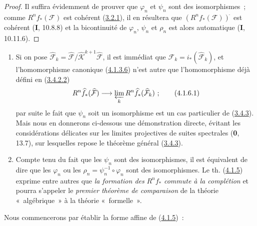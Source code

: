 \begin{proof}
Il suffira évidemment de prouver que $\varphi_n$ et $\psi_n$ sont des
isomorphismes~; comme $R^nf_*(\mathcal F)$ est cohérent
(\hyperref[III.3.2.1-fr]{3.2.1}), il en résultera que
$(R^nf_*(\mathcal F))^{\widehat{\,}}$ est cohérent (\textbf{I}, 10.8.8) et la bicontinuité
de $\varphi_n$, $\psi_n$ et $\rho_n$ est alors automatique (\textbf{I}, 10.11.6).
\end{proof}

\begin{remarks}[4.1.6]
\label{III.4.1.6-fr}
\upshape
\begin{enumerate}
\item[(i)] Si on pose
$\widehat{\mathcal F}_k=
\widehat{\mathcal F}/\widehat{\mathcal K}^{k+1}
\widehat{\mathcal F}$, il est immédiat que
$\mathcal F_k=i_*(\widehat{\mathcal F}_k)$, et l'homomorphisme canonique
(\hyperref[III.4.1.3.6-fr]{4.1.3.6}) n'est autre que l'homomorphisme déjà
défini en (\hyperref[III.3.4.2.2-fr]{3.4.2.2})
\[
R^n\widehat f_*(\widehat{\mathcal F})
\longrightarrow\varprojlim_kR^n\widehat f_*(\widehat{\mathcal F}_k)~;
\tag{4.1.6.1}\label{III.4.1.6.1-fr}
\]
par suite le fait que $\psi_n$ soit un isomorphisme est un cas particulier
de (\hyperref[III.3.4.3-fr]{3.4.3}). Mais nous en donnerons ci-dessous une
démonstration directe, évitant les considérations délicates sur les limites
projectives de suites spectrales (\textbf{0}, 13.7), sur lesquelles repose le
théorème général (\hyperref[III.3.4.3-fr]{3.4.3}).

\item[(ii)] Compte tenu du fait que les $\psi_n$ sont des isomorphismes, il
est équivalent de dire que les $\varphi_n$ ou les
$\rho_n=\psi_n^{-1}\circ\varphi_n$ sont des isomorphismes. Le th.
(\hyperref[III.4.1.5-fr]{4.1.5}) exprime entre autres que \emph{la formation des}
$R^nf_*$ \emph{commute à la complétion} et pourra s'appeler le \emph{premier théorème de
comparaison} de la théorie «~algébrique~» à la théorie «~formelle~».
\end{enumerate}

Nous commencerons par établir la forme affine de
(\hyperref[III.4.1.5-fr]{4.1.5})~:
\end{remarks}

